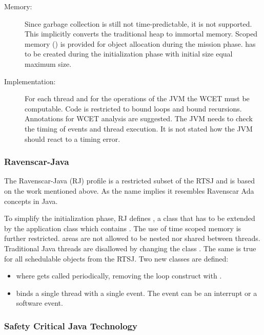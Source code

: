 \begin{description}
\item[Memory:] Since garbage collection is still not
time-predictable, it is not supported. This implicitly converts the
traditional heap to immortal memory. Scoped memory ()
is provided for object allocation during the mission phase.
 has to be created during the initialization phase
with initial size equal maximum size.

\item[Implementation:] For each thread and for the operations
of the JVM the WCET must be computable. Code is restricted to bound
loops and bound recursions. Annotations for WCET analysis are
suggested. The JVM needs to check the timing of events and thread
execution. It is not stated how the JVM should react to a timing
error.

\end{description}

\subsubsection{Ravenscar-Java}
\label{subsec:rj}

The Ravenscar-Java (RJ) profile \cite{583825} is a restricted subset
of the RTSJ and is based on the work mentioned above. As the name
implies it resembles Ravenscar Ada \cite{289525} concepts in Java.


To simplify the initialization phase, RJ defines ,
a class that has to be extended by the application class which
contains . The use of time scoped memory is further
restricted.  areas are not allowed to be nested nor
shared between threads. Traditional Java threads are disallowed by
changing the class . The same is true for all
schedulable objects from the RTSJ. Two new classes are defined:
\begin{itemize}
    \item {} where  gets called periodically,
removing the loop construct with .
    \item {} binds a single thread with a
single event. The event can be an interrupt or a software event.

\end{itemize}

\subsubsection{Safety Critical Java Technology}

